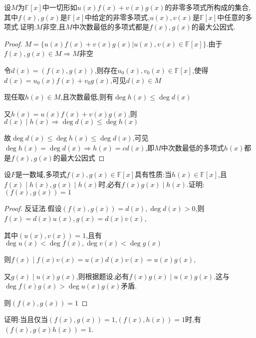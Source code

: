 \begin{example}
    设$M$为$\mathbb{F}[x]$中一切形如$u(x)f(x)+v(x)g(x)$的非零多项式所构成的集合,其中$f(x),g(x)$是$\mathbb{F}[x]$中给定的非零多项式,$u(x),v(x)$是$\mathbb{F}[x]$中任意的多项式.证明:$M$非空,且$M$中次数最低的多项式都是$f(x),g(x)$的最大公因式. 
\end{example}

\begin{proof}

    $M=\{u(x)f(x)+v(x)g(x)|u(x),v(x)\in \mathbb{F}[x]\}$.由于$f(x),g(x)\in M\Longrightarrow M$非空

    令$d(x)=(f(x),g(x))$,则存在$u_0(x),v_0(x)\in \mathbb{F}[x]$,使得$d(x)=u_0(x)f(x)+v_0g(x)$,可见$d(x)\in M$

    现任取$h(x)\in M$,且次数最低,则有$\deg h(x)\le \deg d(x)$

    又$h(x)=u(x)f(x)+v(x)g(x)$,则$d(x)\mid h(x)\Longrightarrow \deg d(x)\le \deg h(x)$

    故$\deg d(x)\le \deg h(x) \le \deg d(x)$,可见$\deg h(x)=\deg d(x)\Longrightarrow h(x)=cd(x)$,即$M$中次数最低的多项式$h(x)$都是$f(x),g(x)$的最大公因式 
\end{proof}

\begin{example}
    设$F$是一数域,多项式$f(x),g(x)\in \mathbb{F}[x]$具有性质:当$h(x)\in \mathbb{F}[x]$,且$f(x)\mid h(x),g(x)\mid h(x)$时,必有$f(x)g(x)\mid h(x)$.证明:$(f(x),g(x))=1$
\end{example}

\begin{proof}
    
    反证法.假设$(f(x),g(x))=d(x),\deg d(x)>0$,则$f(x)=d(x)u(x),g(x)=d(x)v(x)$,
    
    其中$(u(x),v(x))=1$,且有$\deg u(x)<\deg f(x),\deg v(x)<\deg g(x)$

    则$f(x)\mid f(x)v(x) = u(x)d(x)v(x)=u(x)g(x)$,
    
    又$g(x)\mid u(x)g(x)$,则根据题设,必有$f(x)g(x)\mid u(x)g(x)$.这与$\deg f(x)g(x)>\deg u(x)g(x)$矛盾. 

    则$(f(x),g(x))=1$
\end{proof}

\begin{example}
    证明:当且仅当$(f(x),g(x))=1$,$(f(x),h(x))=1$时,有$(f(x),g(x)h(x))=1$. 
\end{example}

